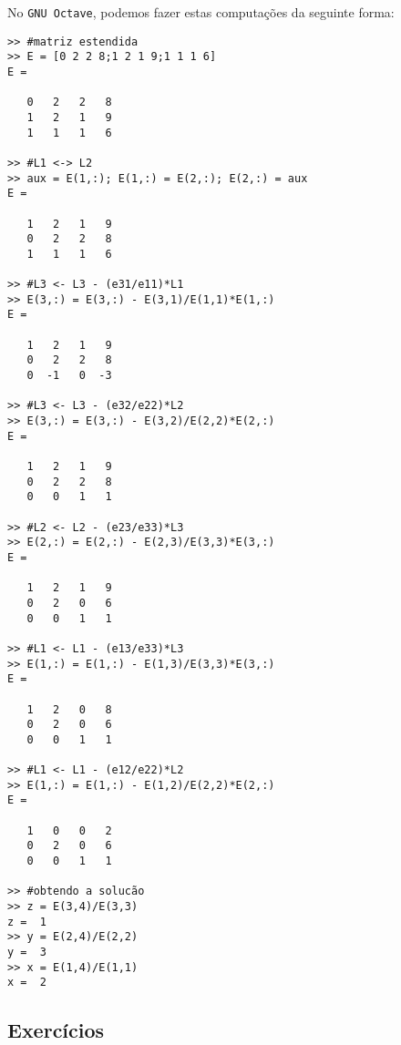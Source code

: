 \begin{resol}
\ifisoctave
No \verb+GNU Octave+, podemos fazer estas computações da seguinte forma:
\begin{verbatim}
>> #matriz estendida
>> E = [0 2 2 8;1 2 1 9;1 1 1 6]
E =

   0   2   2   8
   1   2   1   9
   1   1   1   6

>> #L1 <-> L2
>> aux = E(1,:); E(1,:) = E(2,:); E(2,:) = aux
E =

   1   2   1   9
   0   2   2   8
   1   1   1   6

>> #L3 <- L3 - (e31/e11)*L1
>> E(3,:) = E(3,:) - E(3,1)/E(1,1)*E(1,:)
E =

   1   2   1   9
   0   2   2   8
   0  -1   0  -3

>> #L3 <- L3 - (e32/e22)*L2
>> E(3,:) = E(3,:) - E(3,2)/E(2,2)*E(2,:)
E =

   1   2   1   9
   0   2   2   8
   0   0   1   1

>> #L2 <- L2 - (e23/e33)*L3
>> E(2,:) = E(2,:) - E(2,3)/E(3,3)*E(3,:)
E =

   1   2   1   9
   0   2   0   6
   0   0   1   1

>> #L1 <- L1 - (e13/e33)*L3
>> E(1,:) = E(1,:) - E(1,3)/E(3,3)*E(3,:)
E =

   1   2   0   8
   0   2   0   6
   0   0   1   1

>> #L1 <- L1 - (e12/e22)*L2
>> E(1,:) = E(1,:) - E(1,2)/E(2,2)*E(2,:)
E =

   1   0   0   2
   0   2   0   6
   0   0   1   1

>> #obtendo a solucão
>> z = E(3,4)/E(3,3)
z =  1
>> y = E(2,4)/E(2,2)
y =  3
>> x = E(1,4)/E(1,1)
x =  2
\end{verbatim}
\fi

\end{resol}


\subsection*{Exercícios}

